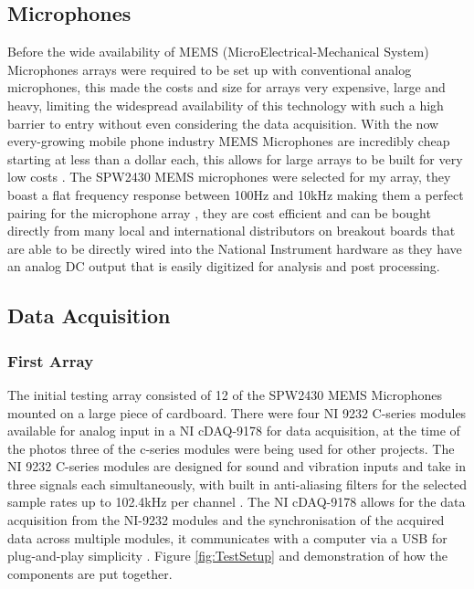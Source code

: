 \documentclass{UoNMCHA}
\numberwithin{equation}{section}
\begin{document}
\subsection{Microphones} \label{sec:Microphones}
    Before the wide availability of MEMS (MicroElectrical-Mechanical System) Microphones arrays were required to be set up with conventional analog microphones, this made the costs and size for arrays very expensive, large and heavy, limiting the widespread availability of this technology with such a high barrier to entry without even considering the data acquisition. With the now every-growing mobile phone industry MEMS Microphones are incredibly cheap starting at less than a dollar each, this allows for large arrays to be built for very low costs \citep{San17}. The SPW2430 MEMS microphones were selected for my array, they boast a flat frequency response between 100Hz and 10kHz making them a perfect pairing for the microphone array \citep{Ada}, they are cost efficient and can be bought directly from many local and international distributors on breakout boards that are able to be directly wired into the National Instrument hardware as they have an analog DC output that is easily digitized for analysis and post processing.
\subsection{Data Acquisition} \label{sec:DAQ}

\subsubsection{First Array} \label{sec:First Design DAQ}
    The initial testing array consisted of 12 of the SPW2430 MEMS Microphones mounted on a large piece of cardboard. There were four NI 9232 C-series modules available for analog input in a NI cDAQ-9178 for data acquisition, at the time of the photos three of the c-series modules were being used for other projects. The NI 9232 C-series modules are designed for sound and vibration inputs and take in three signals each simultaneously, with built in anti-aliasing filters for the selected sample rates up to 102.4kHz per channel \citep{NI9232}. The NI cDAQ-9178 allows for the data acquisition from the NI-9232 modules and the synchronisation of the acquired data across multiple modules, it communicates with a computer via a USB for plug-and-play simplicity \citep{cDAQ9178}. Figure \ref{fig:TestSetup} and demonstration of how the components are put together.
\end{document}
